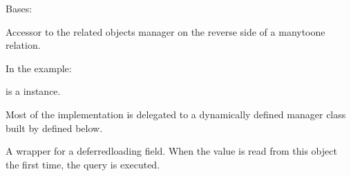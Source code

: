 \documentclass[letterpaper,10pt,english]{sphinxmanual}
\begin{document}
\begin{fulllineitems}
\begin{fulllineitems}
\label{\detokenize{app:app.models.resources_categories.MultipleObjectsReturned}}
\pysigstartsignatures
{}
\pysigstopsignatures
\sphinxAtStartPar
Bases: 

\end{fulllineitems}


\begin{fulllineitems}
\label{\detokenize{app:app.models.resources_categories.assigned_resources_set}}
\pysigstartsignatures
{}
\pysigstopsignatures
\sphinxAtStartPar
Accessor to the related objects manager on the reverse side of a
many\sphinxhyphen{}to\sphinxhyphen{}one relation.

\sphinxAtStartPar
In the example:

\begin{sphinxVerbatim}[commandchars=\\\{\}]
 
       
\end{sphinxVerbatim}

\sphinxAtStartPar
{} is a  instance.

\sphinxAtStartPar
Most of the implementation is delegated to a dynamically defined manager
class built by  defined below.

\end{fulllineitems}


\begin{fulllineitems}
\label{\detokenize{app:app.models.resources_categories.category}}
\pysigstartsignatures
{}
\pysigstopsignatures
\sphinxAtStartPar
A wrapper for a deferred\sphinxhyphen{}loading field. When the value is read from this
object the first time, the query is executed.


\end{fulllineitems}
\end{fulllineitems}
\end{document}
